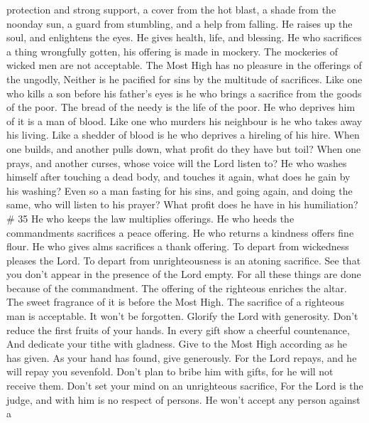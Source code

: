 protection and strong support, a cover from the hot blast, a shade from
the noonday sun, a guard from stumbling, and a help from falling.
 He raises up the soul, and enlightens the eyes. He gives
health, life, and blessing.  He who sacrifices a thing
wrongfully gotten, his offering is made in mockery. The mockeries of
wicked men are not acceptable.  The Most High has no
pleasure in the offerings of the ungodly, Neither is he pacified for
sins by the multitude of sacrifices.  Like one who kills a
son before his father's eyes is he who brings a sacrifice from the goods
of the poor.  The bread of the needy is the life of the
poor. He who deprives him of it is a man of blood.  Like
one who murders his neighbour is he who takes away his living. Like a
shedder of blood is he who deprives a hireling of his hire.
 When one builds, and another pulls down, what profit do
they have but toil?  When one prays, and another curses,
whose voice will the Lord listen to?  He who washes himself
after touching a dead body, and touches it again, what does he gain by
his washing?  Even so a man fasting for his sins, and going
again, and doing the same, who will listen to his prayer? What profit
does he have in his humiliation? \# 35  He who keeps the law
multiplies offerings. He who heeds the commandments sacrifices a peace
offering.  He who returns a kindness offers fine flour. He
who gives alms sacrifices a thank offering.  To depart from
wickedness pleases the Lord. To depart from unrighteousness is an
atoning sacrifice.  See that you don't appear in the
presence of the Lord empty.  For all these things are done
because of the commandment.  The offering of the righteous
enriches the altar. The sweet fragrance of it is before the Most High.
 The sacrifice of a righteous man is acceptable. It won't be
forgotten.  Glorify the Lord with generosity. Don't reduce
the first fruits of your hands.  In every gift show a
cheerful countenance, And dedicate your tithe with gladness.
 Give to the Most High according as he has given. As your
hand has found, give generously.  For the Lord repays, and
he will repay you sevenfold.  Don't plan to bribe him with
gifts, for he will not receive them. Don't set your mind on an
unrighteous sacrifice, For the Lord is the judge, and with him is no
respect of persons.  He won't accept any person against a
